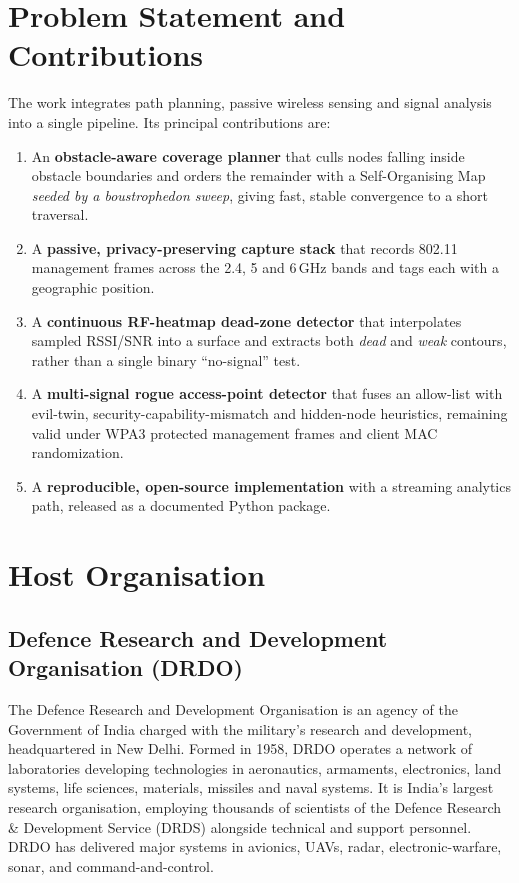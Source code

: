 \section{Problem Statement and Contributions}
The work integrates path planning, passive wireless sensing and signal analysis
into a single pipeline. Its principal contributions are:
\begin{enumerate}
  \item An \textbf{obstacle-aware coverage planner} that culls nodes falling
        inside obstacle boundaries and orders the remainder with a
        Self-Organising Map \emph{seeded by a boustrophedon sweep}, giving fast,
        stable convergence to a short traversal.
  \item A \textbf{passive, privacy-preserving capture stack} that records 802.11
        management frames across the 2.4, 5 and 6\,GHz bands and tags each with a
        geographic position.
  \item A \textbf{continuous RF-heatmap dead-zone detector} that interpolates
        sampled RSSI/SNR into a surface and extracts both \emph{dead} and
        \emph{weak} contours, rather than a single binary ``no-signal'' test.
  \item A \textbf{multi-signal rogue access-point detector} that fuses an
        allow-list with evil-twin, security-capability-mismatch and hidden-node
        heuristics, remaining valid under WPA3 protected management frames and
        client MAC randomization.
  \item A \textbf{reproducible, open-source implementation} with a streaming
        analytics path, released as a documented Python package.
\end{enumerate}

\section{Host Organisation}

\subsection{Defence Research and Development Organisation (DRDO)}
The Defence Research and Development Organisation is an agency of the Government
of India charged with the military's research and development, headquartered in
New Delhi. Formed in 1958, DRDO operates a network of laboratories developing
technologies in aeronautics, armaments, electronics, land systems, life
sciences, materials, missiles and naval systems. It is India's largest research
organisation, employing thousands of scientists of the Defence Research \&
Development Service (DRDS) alongside technical and support personnel. DRDO has
delivered major systems in avionics, UAVs, radar, electronic-warfare, sonar, and
command-and-control.

